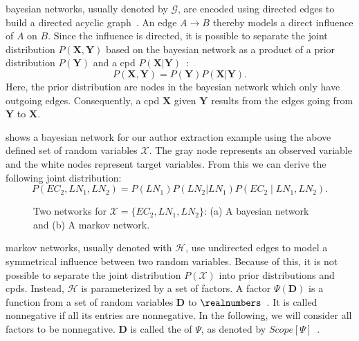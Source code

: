 \bigskip

\Glspl{bayesian network}, usually denoted by $\mathcal{G}$, are encoded using directed \glspl{edge} to build a directed acyclic graph~\citep{koller2009probabilistic}.
An \gls{edge} $A\to B$ thereby models a direct influence of $A$ on $B$.
Since the influence is directed, it is possible to separate the \gls{joint distribution} $P(\mathbf{X},\mathbf{Y})$ based on the \gls{bayesian network} as a product of a \gls{prior distribution} $P(\mathbf{Y})$ and a \gls{cpd} $P(\mathbf{X}|\mathbf{Y})$~\citep{sutton2010introduction}:
\begin{equation}
  P(\mathbf{X},\mathbf{Y})=P(\mathbf{Y})P(\mathbf{X}|\mathbf{Y}).
\end{equation}
Here, the \gls{prior distribution} are \glspl{node} in the \gls{bayesian network} which only have outgoing \glspl{edge}.
Consequently, a \gls{cpd} $\mathbf{X}$ given $\mathbf{Y}$ results from the \glspl{edge} going from $\mathbf{Y}$ to $\mathbf{X}$.

 shows a \gls{bayesian network} for our author extraction example using the above defined set of \glspl{random variable} $\mathcal{X}$.
The gray node represents an \gls{observed variable} and the white nodes represent \glspl{target variable}.
From this we can derive the following \gls{joint distribution}:
\begin{equation*}
  P(EC_2,LN_1,LN_2)=P(LN_1)P(LN_2|LN_1)P(EC_2\mid LN_1,LN_2).
\end{equation*}

\begin{figure}[t]
\centering

\caption[Two networks for $\mathcal{X}=\{EC_2,LN_1,LN_2\}$]{%
  Two networks for $\mathcal{X}=\{EC_2,LN_1,LN_2\}$:
  (a) A \gls{bayesian network} and (b) A \gls{markov network}.
}
\label{fig:example-networks}
\end{figure}

\bigskip

\Glspl{markov network}, usually denoted with $\mathcal{H}$, use undirected \glspl{edge} to model a symmetrical influence between two \glspl{random variable}.
Because of this, it is not possible to separate the \gls{joint distribution} $P(\mathcal{X})$ into \glspl{prior distribution} and \glspl{cpd}.
Instead, $\mathcal{H}$ is parameterized by a set of \glspl{factor}.
A \gls{factor} $\Psi(\mathbf{D})$ is a function from a set of \glspl{random variable} $\mathbf{D}$ to $\realnumbers$~\citep{koller2009probabilistic}.
It is called nonnegative if all its entries are nonnegative.
In the following, we will consider all factors to be nonnegative.
$\mathbf{D}$ is called the  of $\Psi$, as denoted by $Scope[\Psi]$~\citep{koller2009probabilistic}.

